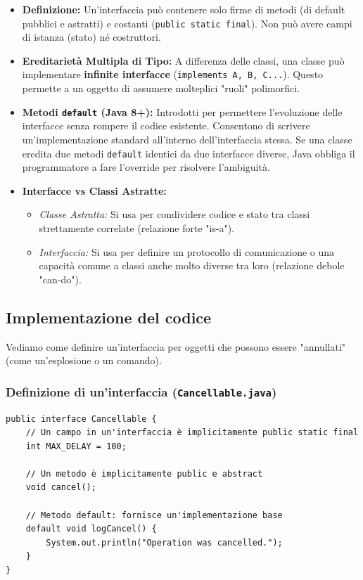 \documentclass[12pt, a4paper]{article}
\begin{document}
\begin{itemize}
    \item \textbf{Definizione:} Un'interfaccia può contenere solo firme di metodi (di default pubblici e astratti) e costanti (\texttt{public static final}). Non può avere campi di istanza (stato) né costruttori.
    \item \textbf{Ereditarietà Multipla di Tipo:} A differenza delle classi, una classe può implementare \textbf{infinite interfacce} (\texttt{implements A, B, C...}). Questo permette a un oggetto di assumere molteplici "ruoli" polimorfici.
    \item \textbf{Metodi \texttt{default} (Java 8+):} Introdotti per permettere l'evoluzione delle interfacce senza rompere il codice esistente. Consentono di scrivere un'implementazione standard all'interno dell'interfaccia stessa. Se una classe eredita due metodi \texttt{default} identici da due interfacce diverse, Java obbliga il programmatore a fare l'override per risolvere l'ambiguità.
    \item \textbf{Interfacce vs Classi Astratte:} 
    \begin{itemize}
        \item \textit{Classe Astratta:} Si usa per condividere codice e stato tra classi strettamente correlate (relazione forte "is-a").
        \item \textit{Interfaccia:} Si usa per definire un protocollo di comunicazione o una capacità comune a classi anche molto diverse tra loro (relazione debole "can-do").
    \end{itemize}
\end{itemize}

\subsection{Implementazione del codice}
Vediamo come definire un'interfaccia per oggetti che possono essere "annullati" (come un'esplosione o un comando).

\subsubsection{Definizione di un'interfaccia (\texttt{Cancellable.java})}
\begin{verbatim}
public interface Cancellable {
    // Un campo in un'interfaccia è implicitamente public static final
    int MAX_DELAY = 100; 

    // Un metodo è implicitamente public e abstract
    void cancel();

    // Metodo default: fornisce un'implementazione base
    default void logCancel() {
        System.out.println("Operation was cancelled.");
    }
}
\end{verbatim}
\end{document}
